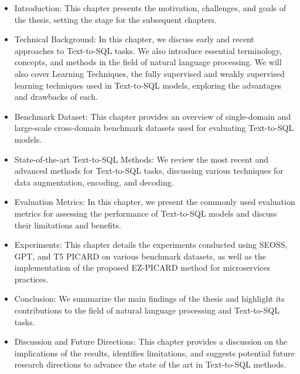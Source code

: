 \begin{itemize}
    \item Introduction: This chapter presents the motivation, challenges, and goals of the thesis, setting the stage for the subsequent chapters.
    \item Technical Background: In this chapter, we discuss early and recent approaches to Text-to-SQL tasks. We also introduce essential terminology, concepts, and methods in the field of natural language processing. We will also cover Learning Techniques, the fully supervised and weakly supervised learning techniques used in Text-to-SQL models, exploring the advantages and drawbacks of each.
    \item Benchmark Dataset: This chapter provides an overview of single-domain and large-scale cross-domain benchmark datasets used for evaluating Text-to-SQL models.
    \item State-of-the-art Text-to-SQL Methods: We review the most recent and advanced methods for Text-to-SQL tasks, discussing various techniques for data augmentation, encoding, and decoding.
    \item Evaluation Metrics: In this chapter, we present the commonly used evaluation metrics for assessing the performance of Text-to-SQL models and discuss their limitations and benefits.
    \item Experiments: This chapter details the experiments conducted using SEOSS, GPT, and T5 PICARD on various benchmark datasets, as well as the implementation of the proposed EZ-PICARD method for microservices practices.
    \item Conclusion: We summarize the main findings of the thesis and highlight its contributions to the field of natural language processing and Text-to-SQL tasks.
    \item Discussion and Future Directions: This chapter provides a discussion on the implications of the results, identifies limitations, and suggests potential future research directions to advance the state of the art in Text-to-SQL methods.
\end{itemize}
